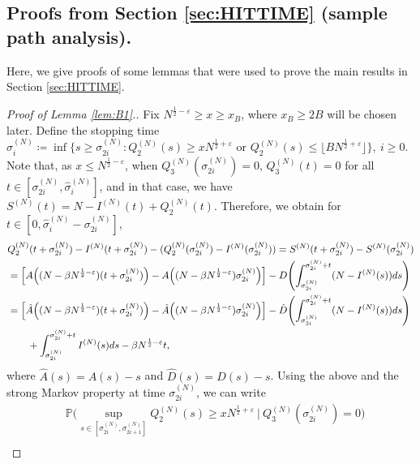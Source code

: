 \documentclass[11pt, reqno]{article}
\DeclarePairedDelimiter\autobracket{(}{)}
\newcommand{\br}[1]{\autobracket*{#1}}
\numberwithin{equation}{section}
\numberwithin{theorem}{section}
\begin{document}
\begin{appendix}
\section{Proofs from Section \ref{sec:HITTIME} (sample path analysis).}\label{sampleapp}

Here, we give proofs of some lemmas that were used to prove the main results in Section \ref{sec:HITTIME}.

\begin{proof}[Proof of Lemma \ref{lem:B1}.]
Fix $N^{\frac{1}{2}-\varepsilon}\geq x\geq x_B$, where $x_B \ge 2B$ will be chosen later. 
Define the stopping time 
$\hat{\sigma}^{(N)}_i\coloneqq\inf\{s\geq \sigma^{(N)}_{2i}:Q^{(N)}_2(s)\geq xN^{\frac{1}{2}+\varepsilon}\text{ or }Q^{(N)}_2(s)\leq \lfloor BN^{\frac{1}{2}+\varepsilon}\rfloor\},\ i\geq 0.$
Note that, as $x \le N^{\frac{1}{2}-\varepsilon}$, when $Q^{(N)}_3(\sigma^{(N)}_{2i})=0$, $Q^{(N)}_3(t)=0$ for all $t\in[\sigma^{(N)}_{2i},\hat{\sigma}^{(N)}_i]$, and
in that case, we have $S^{(N)}(t)=N-I^{(N)}(t)+Q^{(N)}_2(t)$. 
Therefore, we obtain for $t\in[0,\hat{\sigma}^{(N)}_i-\sigma^{(N)}_{2i}]$,
\begin{align*}
    &Q^{(N)}_2(t+\sigma^{(N)}_{2i})-I^{(N)}(t+\sigma^{(N)}_{2i})-(Q^{(N)}_2(\sigma^{(N)}_{2i})-I^{(N)}(\sigma^{(N)}_{2i})) =S^{(N)}(t+\sigma^{(N)}_{2i})-S^{(N)}(\sigma^{(N)}_{2i})\\
    &=\left[A\br{(N-\beta N^{\frac{1}{2}-\varepsilon})(t+ \sigma^{(N)}_{2i})} - A\br{(N-\beta N^{\frac{1}{2}-\varepsilon})\sigma^{(N)}_{2i}}\right] - D\br{\int_{\sigma^{(N)}_{2i}}^{\sigma^{(N)}_{2i}+t}(N-I^{(N)}(s))ds}\\
    &=\left[\hat A\br{(N-\beta N^{\frac{1}{2}-\varepsilon})(t+ \sigma^{(N)}_{2i})} - \hat A\br{(N-\beta N^{\frac{1}{2}-\varepsilon})\sigma^{(N)}_{2i}}\right] -  \hat D\br{\int_{\sigma^{(N)}_{2i}}^{\sigma^{(N)}_{2i}+t}(N-I^{(N)}(s))ds}\\
    &\qquad +\int_{\sigma^{(N)}_{2i}}^{\sigma^{(N)}_{2i}+t}I^{(N)}(s)ds-\beta N^{\frac{1}{2}-\varepsilon}t,
\end{align*}
where $\hat{A}(s)=A(s)-s$ and $\hat{D}(s)=D(s)-s$. 
Using the above and the strong Markov property at time $\sigma^{(N)}_{2i}$, we can write
\begin{equation}\label{eq:B1-1}
    \begin{split}
        &\mathbb{P}\Big(\sup_{s\in[\sigma^{(N)}_{2i},\sigma^{(N)}_{2i+1}]}Q^{(N)}_2(s)\geq xN^{\frac{1}{2}+\varepsilon}\ \Big|\ Q^{(N)}_3(\sigma^{(N)}_{2i})=0\Big)\\

\end{split}
\end{equation}
\end{proof}
\end{appendix}
\end{document}
